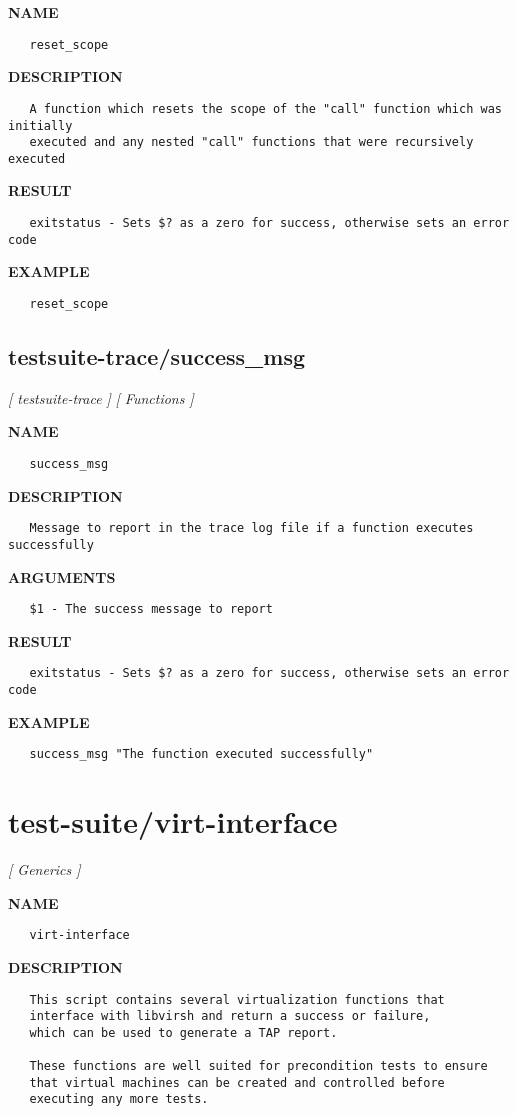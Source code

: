 \label{ch:robo58}
\label{ch:testsuite_trace_reset_scope}
\textbf{NAME}
\begin{verbatim}
   reset_scope
\end{verbatim}
\textbf{DESCRIPTION}
\begin{verbatim}
   A function which resets the scope of the "call" function which was initially
   executed and any nested "call" functions that were recursively executed
\end{verbatim}
\textbf{RESULT}
\begin{verbatim}
   exitstatus - Sets $? as a zero for success, otherwise sets an error code
\end{verbatim}
\textbf{EXAMPLE}
\begin{verbatim}
   reset_scope
\end{verbatim}
\newpage
\subsection{testsuite-trace/success\_msg}
\textsl{[ testsuite-trace ]}
\textsl{[ Functions ]}

\label{ch:robo59}
\label{ch:testsuite_trace_success_msg}
\textbf{NAME}
\begin{verbatim}
   success_msg
\end{verbatim}
\textbf{DESCRIPTION}
\begin{verbatim}
   Message to report in the trace log file if a function executes successfully
\end{verbatim}
\textbf{ARGUMENTS}
\begin{verbatim}
   $1 - The success message to report
\end{verbatim}
\textbf{RESULT}
\begin{verbatim}
   exitstatus - Sets $? as a zero for success, otherwise sets an error code
\end{verbatim}
\textbf{EXAMPLE}
\begin{verbatim}
   success_msg "The function executed successfully"
\end{verbatim}
\newpage
\section{test-suite/virt-interface}
\textsl{[ Generics ]}

\label{ch:robo44}
\label{ch:test_suite_virt_interface}
\textbf{NAME}
\begin{verbatim}
   virt-interface
\end{verbatim}
\textbf{DESCRIPTION}
\begin{verbatim}
   This script contains several virtualization functions that
   interface with libvirsh and return a success or failure, 
   which can be used to generate a TAP report.

   These functions are well suited for precondition tests to ensure
   that virtual machines can be created and controlled before 
   executing any more tests.
\end{verbatim}
\newpage
